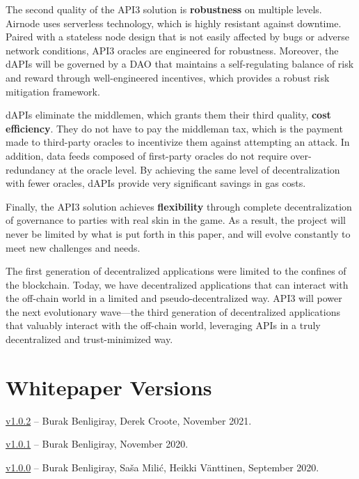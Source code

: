 \documentclass[11pt]{article}
\begin{document}
The second quality of the API3 solution is \textbf{robustness} on multiple levels.
Airnode uses serverless technology, which is highly resistant against downtime.
Paired with a stateless node design that is not easily affected by bugs or adverse network conditions, API3 oracles are engineered for robustness.
Moreover, the dAPIs will be governed by a DAO that maintains a self-regulating balance of risk and reward through well-engineered incentives, which provides a robust risk mitigation framework.

dAPIs eliminate the middlemen, which grants them their third quality, \textbf{cost efficiency}.
They do not have to pay the middleman tax, which is the payment made to third-party oracles to incentivize them against attempting an attack.
In addition, data feeds composed of first-party oracles do not require over-redundancy at the oracle level.
By achieving the same level of decentralization with fewer oracles, dAPIs provide very significant savings in gas costs.

Finally, the API3 solution achieves \textbf{flexibility} through complete decentralization of governance to parties with real skin in the game.
As a result, the project will never be limited by what is put forth in this paper, and will evolve constantly to meet new challenges and needs.

The first generation of decentralized applications were limited to the confines of the blockchain.
Today, we have decentralized applications that can interact with the off-chain world in a limited and pseudo-decentralized way.
API3 will power the next evolutionary wave---the third generation of decentralized applications that valuably interact with the off-chain world, leveraging APIs in a truly decentralized and trust-minimized way.

\small



\newpage
\normalsize
\appendix
\section{Whitepaper Versions}
\label{sec:versions}

\href{https://github.com/api3dao/api3-whitepaper/releases/tag/v1.0.2}{v1.0.2} -- Burak Benligiray, Derek Croote, November 2021.

\href{https://github.com/api3dao/api3-whitepaper/releases/tag/v1.0.1}{v1.0.1} -- Burak Benligiray, November 2020.

\href{https://github.com/api3dao/api3-whitepaper/releases/tag/v1.0.0}{v1.0.0} -- Burak Benligiray, Sa\v{s}a Mili\'{c}, Heikki Vänttinen, September 2020.
\end{document}
